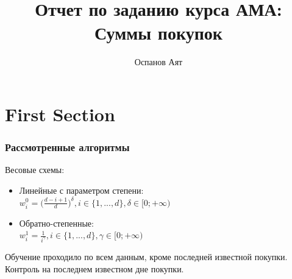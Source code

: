 \documentclass{beamer}
\title[Суммы покупок]{Отчет по заданию \textnumero1 курса АМА: \\ Суммы покупок} %
\author{Оспанов Аят} %
\institute[] %
{
517 группа \\ %
}
\date{} %
\begin{document}
\begin{frame}
\titlepage %
\end{frame}



\section{First Section} %


\begin{frame}
\frametitle{Рассмотренные алгоритмы}
Весовые схемы:
\begin{itemize}
\item Линейные с параметром степени: \\ $w_i^0 = \big(\frac{d - i + 1}{d}\big) ^ \delta, i \in \{1, ..., d\}, \delta \in [0; +\infty)$
\item Обратно-степенные: \\ $w_i^1 = \frac{1}{i ^ \gamma}, i \in \{1, ..., d\}, \gamma \in [0; +\infty)$
\end{itemize}

Обучение проходило по всем данным, кроме последней известной покупки. Контроль на последнем известном дне покупки.
\end{frame}
\end{document}
